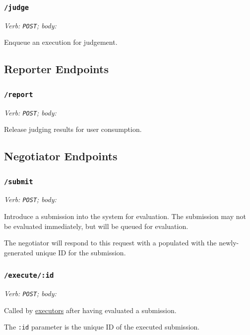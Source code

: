 \documentclass[11pt,letterpaper]{article}
\begin{document}
\subsubsection{\texttt{/judge}}

\emph{Verb: \texttt{POST}; body: }

Enqueue an execution for judgement.

\subsection{Reporter Endpoints}
\label{endpoints-report}

\subsubsection{\texttt{/report}}

\emph{Verb: \texttt{POST}; body: }

Release judging results for user consumption.

\subsection{Negotiator Endpoints}
\label{endpoints-hub}

\subsubsection{\texttt{/submit}}

\emph{Verb: \texttt{POST}; body: }

Introduce a submission into the system for evaluation. The submission may not
be evaluated immediately, but will be queued for evaluation.

The negotiator will respond to this request with a 
populated with the newly-generated unique ID for the submission.

\subsubsection{\texttt{/execute/:id}}

\emph{Verb: \texttt{POST}; body: }

Called by \hyperref[design-exec-judge]{executors} after having evaluated a
submission.

The \texttt{:id} parameter is the unique ID of the executed submission.
\end{document}
